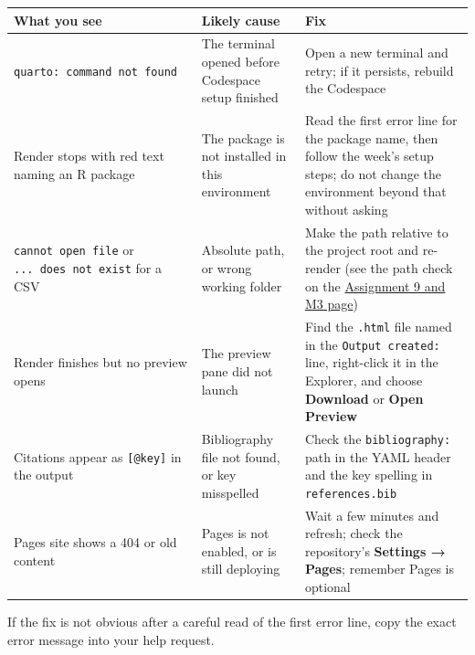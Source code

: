 \documentclass[
  letterpaper,
  DIV=11,
  numbers=noendperiod,
  oneside]{scrreprt}
\begin{document}
\begin{longtable}[]{@{}
  >{\raggedright\arraybackslash}p{}
  >{\raggedright\arraybackslash}p{}
  >{\raggedright\arraybackslash}p{}@{}}
\toprule\noalign{}
\begin{minipage}[b]{\linewidth}\raggedright
What you see
\end{minipage} & \begin{minipage}[b]{\linewidth}\raggedright
Likely cause
\end{minipage} & \begin{minipage}[b]{\linewidth}\raggedright
Fix
\end{minipage} \\
\midrule\noalign{}
\endhead
\bottomrule\noalign{}
\endlastfoot
\texttt{quarto:\ command\ not\ found} & The terminal opened before
Codespace setup finished & Open a new terminal and retry; if it
persists, rebuild the Codespace \\
Render stops with red text naming an R package & The package is not
installed in this environment & Read the first error line for the
package name, then follow the week's setup steps; do not change the
environment beyond that without asking \\
\texttt{cannot\ open\ file} or \texttt{...\ does\ not\ exist} for a CSV
& Absolute path, or wrong working folder & Make the path relative to the
project root and re-render (see the path check on the
\href{report05-assignment-a9-and-m3.qmd}{Assignment 9 and M3 page}) \\
Render finishes but no preview opens & The preview pane did not launch &
Find the \texttt{.html} file named in the \texttt{Output\ created:}
line, right-click it in the Explorer, and choose \textbf{Download} or
\textbf{Open Preview} \\
Citations appear as \texttt{{[}@key{]}} in the output & Bibliography
file not found, or key misspelled & Check the \texttt{bibliography:}
path in the YAML header and the key spelling in
\texttt{references.bib} \\
Pages site shows a 404 or old content & Pages is not enabled, or is
still deploying & Wait a few minutes and refresh; check the repository's
\textbf{Settings → Pages}; remember Pages is optional \\
\end{longtable}

If the fix is not obvious after a careful read of the first error line,
copy the exact error message into your help request.
\end{document}
